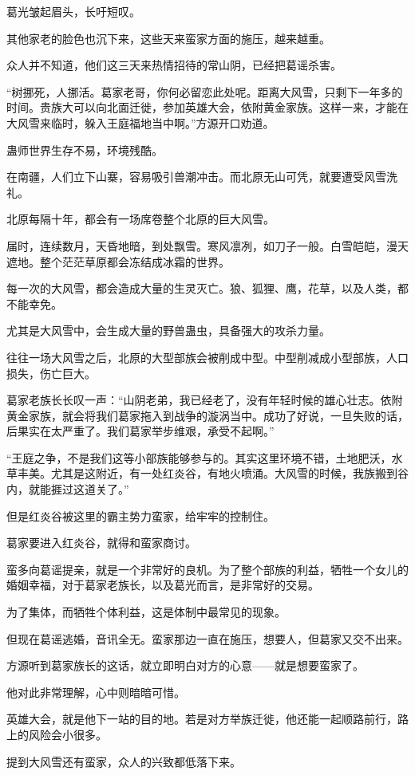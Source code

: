 \begin{this_body}
葛光皱起眉头，长吁短叹。

其他家老的脸色也沉下来，这些天来蛮家方面的施压，越来越重。

众人并不知道，他们这三天来热情招待的常山阴，已经把葛谣杀害。

“树挪死，人挪活。葛家老哥，你何必留恋此处呢。距离大风雪，只剩下一年多的时间。贵族大可以向北面迁徙，参加英雄大会，依附黄金家族。这样一来，才能在大风雪来临时，躲入王庭福地当中啊。”方源开口劝道。

蛊师世界生存不易，环境残酷。

在南疆，人们立下山寨，容易吸引兽潮冲击。而北原无山可凭，就要遭受风雪洗礼。

北原每隔十年，都会有一场席卷整个北原的巨大风雪。

届时，连续数月，天昏地暗，到处飘雪。寒风凛冽，如刀子一般。白雪皑皑，漫天遮地。整个茫茫草原都会冻结成冰霜的世界。

每一次的大风雪，都会造成大量的生灵灭亡。狼、狐狸、鹰，花草，以及人类，都不能幸免。

尤其是大风雪中，会生成大量的野兽蛊虫，具备强大的攻杀力量。

往往一场大风雪之后，北原的大型部族会被削成中型。中型削减成小型部族，人口损失，伤亡巨大。

葛家老族长长叹一声：“山阴老弟，我已经老了，没有年轻时候的雄心壮志。依附黄金家族，就会将我们葛家拖入到战争的漩涡当中。成功了好说，一旦失败的话，后果实在太严重了。我们葛家举步维艰，承受不起啊。”

“王庭之争，不是我们这等小部族能够参与的。其实这里环境不错，土地肥沃，水草丰美。尤其是这附近，有一处红炎谷，有地火喷涌。大风雪的时候，我族搬到谷内，就能捱过这道关了。”

但是红炎谷被这里的霸主势力蛮家，给牢牢的控制住。

葛家要进入红炎谷，就得和蛮家商讨。

蛮多向葛谣提亲，就是一个非常好的良机。为了整个部族的利益，牺牲一个女儿的婚姻幸福，对于葛家老族长，以及葛光而言，是非常好的交易。

为了集体，而牺牲个体利益，这是体制中最常见的现象。

但现在葛谣逃婚，音讯全无。蛮家那边一直在施压，想要人，但葛家又交不出来。

方源听到葛家族长的这话，就立即明白对方的心意——就是想要蛮家了。

他对此非常理解，心中则暗暗可惜。

英雄大会，就是他下一站的目的地。若是对方举族迁徙，他还能一起顺路前行，路上的风险会小很多。

提到大风雪还有蛮家，众人的兴致都低落下来。


\end{this_body}
